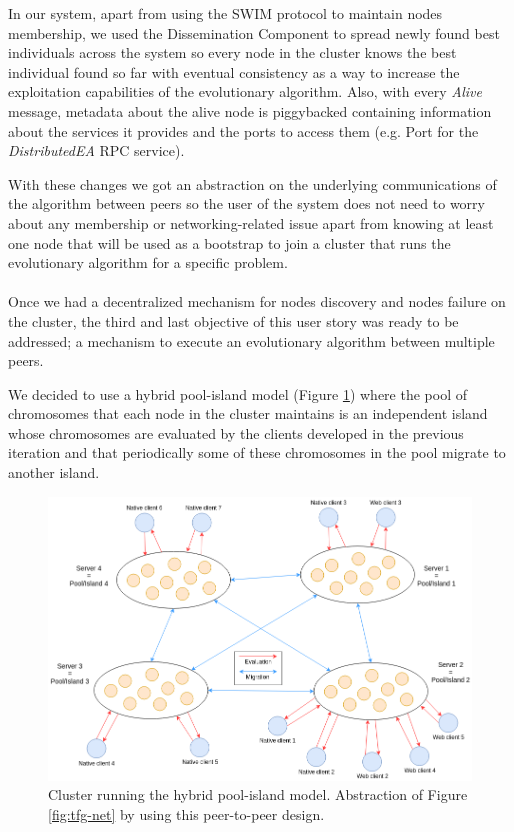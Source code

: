 In our system, apart from using the SWIM protocol to maintain nodes membership, we used the Dissemination Component to spread newly found best individuals across the system so every node in the cluster knows the best individual found so far with eventual consistency as a way to increase the exploitation capabilities of the evolutionary algorithm. Also, with every \textit{Alive} message, metadata about the alive node is piggybacked containing information about the services it provides and the ports to access them (e.g. Port for the \textit{DistributedEA} RPC service).

With these changes we got an abstraction on the underlying communications of the algorithm between peers so the user of the system does not need to worry about any membership or networking-related issue apart from knowing at least one node that will be used as a bootstrap to join a cluster that runs the evolutionary algorithm for a specific problem.


\paragraph*{}
Once we had a decentralized mechanism for nodes discovery and nodes failure on the cluster, the third and last objective of this user story was ready to be addressed; a mechanism to execute an evolutionary algorithm between multiple peers.

We decided to use a hybrid pool-island model (Figure \ref{fig:tfg-net-abstraction}) where the pool of chromosomes that each node in the cluster maintains is an independent island whose chromosomes are evaluated by the clients developed in the previous iteration and that periodically some of these chromosomes in the pool migrate to another island.

\begin{figure}[h!]
		\centering
    	\includegraphics[width=\linewidth]{assets/images/tfg-net-abstraction.png}
    	\caption{Cluster running the hybrid pool-island model. Abstraction of Figure \ref{fig:tfg-net} by using this  peer-to-peer design.}
    	\label{fig:tfg-net-abstraction}
\end{figure}

